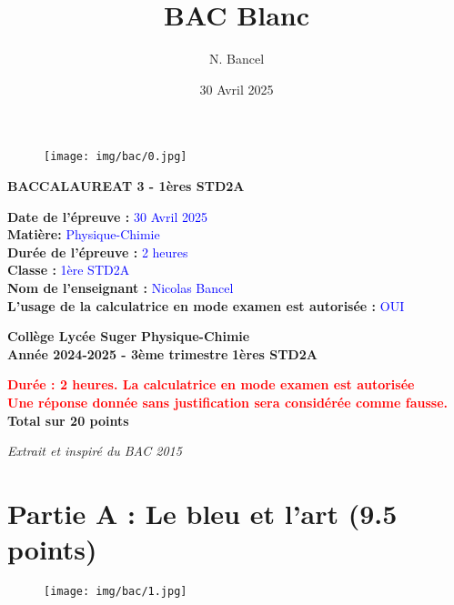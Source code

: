 \documentclass[answers]{exam}
\title{BAC Blanc}
\author{N. Bancel}
\date{30 Avril 2025}
\begin{document}
\begin{figure}[H]
  \centering
  \texttt{[image: img/bac/0.jpg]}
\end{figure}

\vspace{1em}
\vspace{1em}

\textbf{BACCALAUREAT 3 - 1ères STD2A}

\textbf{Date de l'épreuve : } \textcolor{blue}{30 Avril 2025} \\
\textbf{Matière: } \textcolor{blue}{Physique-Chimie} \\
\textbf{Durée de l'épreuve : } \textcolor{blue}{2 heures} \\
\textbf{Classe : } \textcolor{blue}{1ère STD2A} \\
\textbf{Nom de l'enseignant : } \textcolor{blue}{Nicolas Bancel} \\
\textbf{L'usage de la calculatrice en mode examen est autorisée : } \textcolor{blue}{OUI} \\

\newpage

\textbf{Collège Lycée Suger}
\hfill
\textbf{Physique-Chimie} \\

\textbf{Année 2024-2025 - 3ème trimestre}
\hfill
\textbf{1ères STD2A} \par

{\let\newpage\relax\maketitle}

\begin{center}
\textbf{\textcolor{red}{Durée : 2 heures. La calculatrice en mode examen est autorisée}} \\
\textbf{\textcolor{red}{Une réponse donnée sans justification sera considérée comme fausse.}} \\
\textbf{Total sur 20 points }
\end{center}

\textit{Extrait et inspiré du BAC 2015}

\section*{Partie A : Le bleu et l'art (9.5 points)} 

\vspace{1em}

\begin{figure}[H]
  \centering
  \texttt{[image: img/bac/1.jpg]}
\end{figure}
\end{document}
